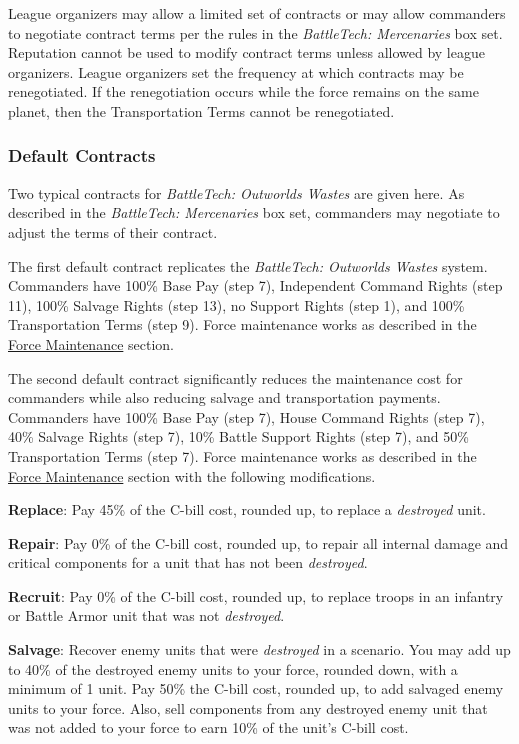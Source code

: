 League organizers may allow a limited set of contracts or may allow commanders to negotiate contract terms per the rules in the \emph{BattleTech: Mercenaries} box set.
Reputation cannot be used to modify contract terms unless allowed by league organizers.
League organizers set the frequency at which contracts may be renegotiated.
If the renegotiation occurs while the force remains on the same planet, then the Transportation Terms cannot be renegotiated.

\subsubsection{Default Contracts}

Two typical contracts for \emph{BattleTech: Outworlds Wastes} are given here.
As described in the \emph{BattleTech: Mercenaries} box set, commanders may negotiate to adjust the terms of their contract.

The first default contract replicates the \emph{BattleTech: Outworlds Wastes} system.
Commanders have 100\% Base Pay (step 7), Independent Command Rights (step 11), 100\% Salvage Rights (step 13), no Support Rights (step 1), and 100\% Transportation Terms (step 9).
Force maintenance works as described in the \hyperref[subsec:force_maintenance]{Force Maintenance} section.

The second default contract significantly reduces the maintenance cost for commanders while also reducing salvage and transportation payments.
Commanders have 100\% Base Pay (step 7), House Command Rights (step 7), 40\% Salvage Rights (step 7), 10\% Battle Support Rights (step 7), and 50\% Transportation Terms (step 7).
Force maintenance works as described in the \hyperref[subsec:force_maintenance]{Force Maintenance} section with the following modifications.

\begin{description}

\item {\bfseries Replace}: Pay 45\% of the C-bill cost, rounded up, to replace a \emph{destroyed} unit.

\item {\bfseries Repair}: Pay 0\% of the C-bill cost, rounded up, to repair all internal damage and critical components for a unit that has not been \emph{destroyed}.

\item {\bfseries Recruit}: Pay 0\% of the C-bill cost, rounded up, to replace troops in an infantry or Battle Armor unit that was not \emph{destroyed}.

\item {\bfseries Salvage}: Recover enemy units that were \emph{destroyed} in a scenario.
You may add up to 40\% of the destroyed enemy units to your force, rounded down, with a minimum of 1 unit.
Pay 50\% the C-bill cost, rounded up, to add salvaged enemy units to your force.
Also, sell components from any destroyed enemy unit that was not added to your force to earn 10\% of the unit's C-bill cost.

\end{description}

